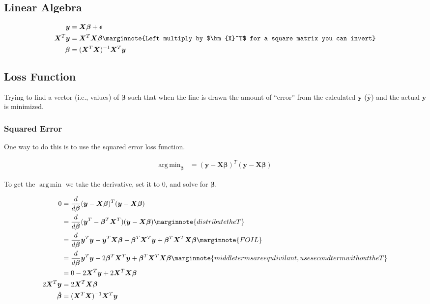 \documentclass[10pt,letterpaper,twoside]{article}
\DeclareMathOperator*{\argmin}{arg\,min}
\begin{document}
\subsection{Linear Algebra}

\begin{align}
    \bm{y}     &= \bm{X}\bm{\beta} + \bm{\epsilon}\\
    \bm{X}^T\bm{y}    &= \bm{X}^T\bm{X}\bm{\beta} \marginnote{Left multiply by $\bm{X}^T$ for a square matrix you can invert}\\
    \bm{\beta}   &= (\bm{X}^T\bm{X})^{-1} \bm{X}^T\bm{y}
\end{align}

\subsection{Loss Function}

Trying to find a vector (i.e., values) of $\bm{\beta}$ such that when the line is drawn
the amount of ``error'' from the calculated $\bm{y}$ ($\hat{\bm{y}}$) and the actual $\bm{y}$ is minimized.

\subsubsection{Squared Error}

One way to do this is to use the squared error loss function.

\begin{align}
    \argmin_{\bm{\beta}} &= (\bm{y} - \bm{X}\bm{\beta})^T (\bm{y} - \bm{X}\bm{\beta})
\end{align}

To get the $\argmin$ we take the derivative, set it to 0, and solve for $\bm{\beta}$.

\begin{align}
     0 &= \frac{d}{d\bm{\beta}} (\bm{y} - \bm{X}\bm{\beta})^T (\bm{y} - \bm{X}\bm{\beta}) \\
       &= \frac{d}{d\bm{\beta}} (\bm{y}^T - \bm{\beta}^T \bm{X}^T) (\bm{y} - \bm{X} \bm{\beta})
         \marginnote{distribute the T}\\
       &= \frac{d}{d\bm{\beta}} \bm{y}^T\bm{y} - \bm{y}^T\bm{X}\bm{\beta} - \bm{\beta}^T\bm{X}^T\bm{y} + \bm{\beta}^T\bm{X}^T\bm{X}\bm{\beta}
         \marginnote{FOIL}\\
       &= \frac{d}{d\bm{\beta}} \bm{y}^T\bm{y} - 2\bm{\beta}^T\bm{X}^T\bm{y} + \bm{\beta}^T\bm{X}^T\bm{X}\bm{\beta}
         \marginnote{middle terms are equlivilant, use second term without the T}
	 \label{equ:equlivilant_transpose}\\
       &= 0 - 2\bm{X}^T\bm{y} + 2\bm{X}^T\bm{X}\bm{\beta}\\
 2\bm{X}^T\bm{y} &= 2\bm{X}^T\bm{X}\bm{\beta}\\
 \hat{\bm{\beta}} &= (\bm{X}^T\bm{X})^{-1}\bm{X}^T\bm{y}
\end{align}
\end{document}
